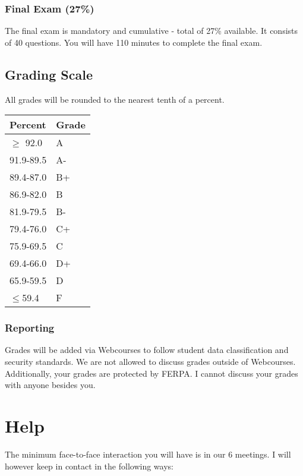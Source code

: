 \documentclass[11pt]{paper}
\begin{document}
\subsubsection{Final Exam (27\%)}


The final exam is mandatory and cumulative - total of 27\% available. It consists of 40 questions. You will have 110 minutes to complete the final exam.

\subsection{Grading Scale}

All grades will be rounded to the nearest tenth of a percent.

\begin{flushleft}
\begin{tabular}{ l  l }\hline
 Percent & Grade \\\hline 
 $\geq$ 92.0 &  A \\
 91.9-89.5 & A-\\
 89.4-87.0 & B+ \\
 86.9-82.0 & B \\
 81.9-79.5 & B- \\
 79.4-76.0 & C+ \\
 75.9-69.5 & C \\
 69.4-66.0 & D+ \\
 65.9-59.5 & D \\
 $\leq$59.4 & F \\\hline
\end{tabular}
\end{flushleft}

\subsubsection{Reporting}

Grades will be added via Webcourses to follow student data classification and security standards. We are not allowed to discuss grades outside of Webcourses. Additionally, your grades are protected by FERPA. I cannot discuss your grades with anyone besides you. 

\section{Help}

The minimum face-to-face interaction you will have is in our 6 meetings. I will however keep in contact in the following ways:
\end{document}
